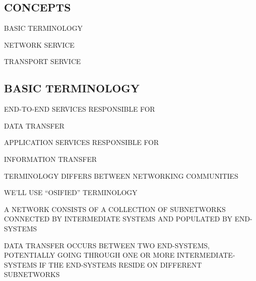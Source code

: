 \begin{bwslide}
\part	{CONCEPTS}\bf

\begin{nrtc}
\item	BASIC TERMINOLOGY

\item	NETWORK SERVICE

\item	TRANSPORT SERVICE
\end{nrtc}
\end{bwslide}


\begin{bwslide}
\part*	{BASIC TERMINOLOGY}\bf

\begin{nrtc}
\item	END-TO-END SERVICES RESPONSIBLE FOR
    \begin{nrtc}
    \item	DATA TRANSFER
    \end{nrtc}

\item	APPLICATION SERVICES RESPONSIBLE FOR
    \begin{nrtc}
    \item	INFORMATION TRANSFER
    \end{nrtc}
\end{nrtc}
\end{bwslide}


\begin{bwslide}

\begin{nrtc}
\item	TERMINOLOGY DIFFERS BETWEEN NETWORKING COMMUNITIES
    \begin{nrtc}
    \item	WE'LL USE ``OSIFIED'' TERMINOLOGY
    \end{nrtc}

\item	A NETWORK CONSISTS OF A COLLECTION OF SUBNETWORKS CONNECTED
	BY INTERMEDIATE SYSTEMS AND POPULATED BY END-SYSTEMS

\item	DATA TRANSFER OCCURS BETWEEN TWO END-SYSTEMS,
	POTENTIALLY GOING THROUGH ONE OR MORE INTERMEDIATE-SYSTEMS
	IF THE END-SYSTEMS RESIDE ON DIFFERENT SUBNETWORKS
\end{nrtc}
\end{bwslide}


